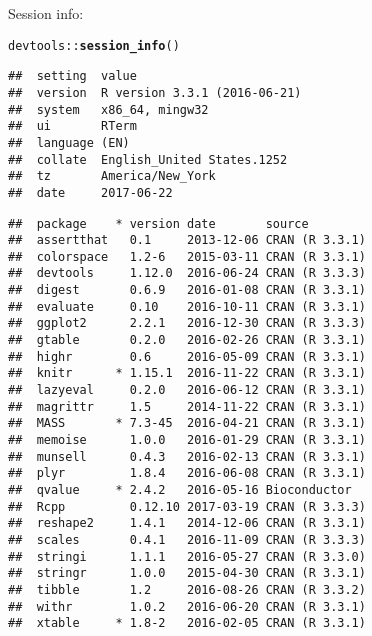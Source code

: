 \documentclass{article}\usepackage[]{graphicx}\usepackage[]{color}
\makeatletter
\newcommand{\hlopt}[1]{\textcolor[rgb]{0,0,0}{#1}}%
\newcommand{\hlstd}[1]{\textcolor[rgb]{0.345,0.345,0.345}{#1}}%
\newcommand{\hlkwd}[1]{\textcolor[rgb]{0.737,0.353,0.396}{\textbf{#1}}}%
\newenvironment{kframe}{%
 \def\at@end@of@kframe{}%
 \ifinner\ifhmode%
  \def\at@end@of@kframe{\end{minipage}}%
  \begin{minipage}{\columnwidth}%
 \fi\fi%
 \def\FrameCommand##1{\hskip\@totalleftmargin \hskip-\fboxsep
 \colorbox{shadecolor}{##1}\hskip-\fboxsep
     \hskip-\linewidth \hskip-\@totalleftmargin \hskip\columnwidth}%
 \MakeFramed {\advance\hsize-\width
   \@totalleftmargin\z@ \linewidth\hsize
   \@setminipage}}%
 {\par\unskip\endMakeFramed%
 \at@end@of@kframe}
\newenvironment{knitrout}{}{} %
\makeatother
\begin{document}
Session info:
\begin{knitrout}
\color{fgcolor}\begin{kframe}
\begin{alltt}
\hlstd{devtools}\hlopt{::}\hlkwd{session_info}\hlstd{()}
\end{alltt}


{\ttfamily\noindent\itshape\color{messagecolor}{\#\# Session info -----------------------------------------------}}\begin{verbatim}
##  setting  value                       
##  version  R version 3.3.1 (2016-06-21)
##  system   x86_64, mingw32             
##  ui       RTerm                       
##  language (EN)                        
##  collate  English_United States.1252  
##  tz       America/New_York            
##  date     2017-06-22
\end{verbatim}


{\ttfamily\noindent\itshape\color{messagecolor}{\#\# Packages ---------------------------------------------------}}\begin{verbatim}
##  package    * version date       source        
##  assertthat   0.1     2013-12-06 CRAN (R 3.3.1)
##  colorspace   1.2-6   2015-03-11 CRAN (R 3.3.1)
##  devtools     1.12.0  2016-06-24 CRAN (R 3.3.3)
##  digest       0.6.9   2016-01-08 CRAN (R 3.3.1)
##  evaluate     0.10    2016-10-11 CRAN (R 3.3.1)
##  ggplot2      2.2.1   2016-12-30 CRAN (R 3.3.3)
##  gtable       0.2.0   2016-02-26 CRAN (R 3.3.1)
##  highr        0.6     2016-05-09 CRAN (R 3.3.1)
##  knitr      * 1.15.1  2016-11-22 CRAN (R 3.3.1)
##  lazyeval     0.2.0   2016-06-12 CRAN (R 3.3.1)
##  magrittr     1.5     2014-11-22 CRAN (R 3.3.1)
##  MASS       * 7.3-45  2016-04-21 CRAN (R 3.3.1)
##  memoise      1.0.0   2016-01-29 CRAN (R 3.3.1)
##  munsell      0.4.3   2016-02-13 CRAN (R 3.3.1)
##  plyr         1.8.4   2016-06-08 CRAN (R 3.3.1)
##  qvalue     * 2.4.2   2016-05-16 Bioconductor  
##  Rcpp         0.12.10 2017-03-19 CRAN (R 3.3.3)
##  reshape2     1.4.1   2014-12-06 CRAN (R 3.3.1)
##  scales       0.4.1   2016-11-09 CRAN (R 3.3.3)
##  stringi      1.1.1   2016-05-27 CRAN (R 3.3.0)
##  stringr      1.0.0   2015-04-30 CRAN (R 3.3.1)
##  tibble       1.2     2016-08-26 CRAN (R 3.3.2)
##  withr        1.0.2   2016-06-20 CRAN (R 3.3.1)
##  xtable     * 1.8-2   2016-02-05 CRAN (R 3.3.1)
\end{verbatim}
\end{kframe}
\end{knitrout}
\end{document}
